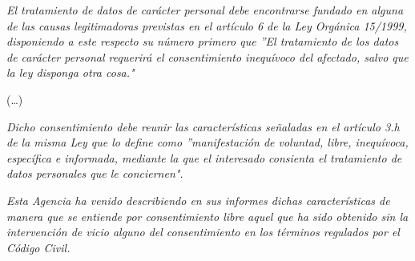 \leftskip=1cm
\rightskip=1cm
{\em 
El tratamiento de datos de carácter personal debe encontrarse fundado
en alguna de las causas legitimadoras previstas en el artículo 6 de la Ley
Orgánica 15/1999, disponiendo a este respecto su número primero que ''El
tratamiento de los datos de carácter personal requerirá el consentimiento
inequívoco del afectado, salvo que la ley disponga otra cosa."}

\leftskip=1cm
\rightskip=1cm
(\dots)

\leftskip=1cm
\rightskip=1cm
{\em Dicho consentimiento debe reunir las características señaladas en el
artículo 3.h de la misma Ley que lo define como ''manifestación de
voluntad, libre, inequívoca, específica e informada, mediante la que el
interesado consienta el tratamiento de datos personales que le
conciernen".}

\leftskip=1cm
\rightskip=1cm
{\em Esta Agencia ha venido describiendo en sus informes dichas
características de manera que se entiende por consentimiento libre aquel que
ha sido obtenido sin la intervención de vicio alguno del consentimiento en los
términos regulados por el Código Civil.
}

\leftskip=0pt
\rightskip=0pt




